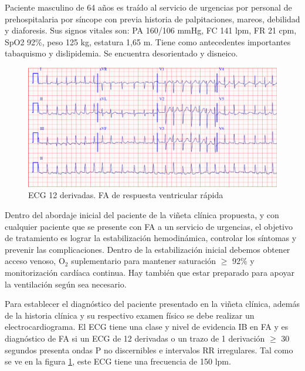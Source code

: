\documentclass[a4paper]{article}
\let\cite=\supercite
\begin{document}
\begin{multicols}{3}
\begin{boxClinica}

Paciente masculino de 64 años es traído al servicio de urgencias por personal
de prehospitalaria por síncope con previa historia de palpitaciones, mareos,
debilidad y diaforesis. Sus signos vitales son: PA 160/106 mmHg, FC 141 lpm,
FR 21 cpm, SpO2 92\%, peso 125 kg, estatura 1,65 m. Tiene como antecedentes
importantes tabaquismo y dislipidemia. Se encuentra desorientado y disneico.

\end{boxClinica}

\begin{figure}[ht]
	\includegraphics[width=\linewidth]{ecg-fa.png}
	\caption{ECG 12 derivadas. FA de respuesta ventricular rápida}
	\label{fig:ecg-fa}
\end{figure}

Dentro del abordaje inicial del paciente de la viñeta clínica propuesta, y con
cualquier paciente que se presente con FA a un servicio de urgencias,
el objetivo de tratamiento es lograr la estabilización hemodinámica,
controlar los síntomas y prevenir las complicaciones. Dentro de la
estabilización inicial debemos obtener acceso venoso, O$_{\text{2}}$
suplementario para mantener saturación $\geq$ 92\% y monitorización cardíaca
continua. Hay también que estar preparado para apoyar la ventilación según
sea necesario.

Para establecer el diagnóstico del paciente presentado en la viñeta clínica,
además de la historia clínica y su respectivo examen físico se debe realizar un
electrocardiograma. El ECG tiene una clase y nivel de evidencia IB en FA y es
diagnóstico de FA si un ECG de 12 derivadas o un trazo de 1 derivación
$\geq$ 30 segundos presenta ondas P no discernibles e intervalos RR
irregulares\cite{guiaesc_2021}. Tal como se ve en la figura \ref{fig:ecg-fa},
este ECG tiene una frecuencia de 150 lpm.


\end{multicols}
\end{document}
